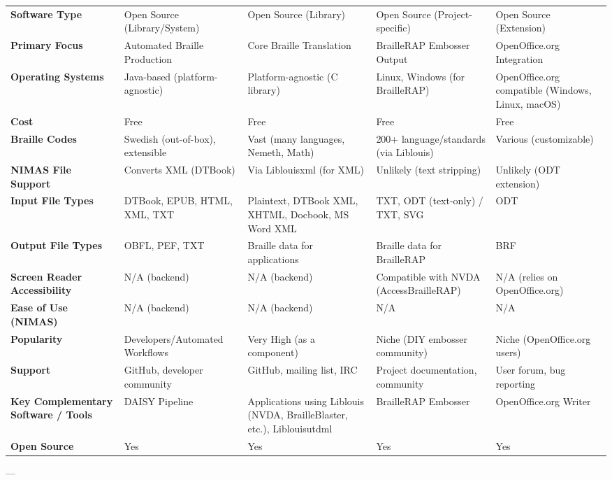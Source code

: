 \begin{longtable}{|p{2.5cm}|p{2.5cm}|p{2.5cm}|p{2.5cm}|}
\textbf{Software Type} & Open Source (Library/System) & Open Source (Library) & Open Source (Project-specific) & Open Source (Extension) \\
\textbf{Primary Focus} & Automated Braille Production & Core Braille Translation & BrailleRAP Embosser Output & OpenOffice.org Integration \\
\textbf{Operating Systems} & Java-based (platform-agnostic) & Platform-agnostic (C library) & Linux, Windows (for BrailleRAP) & OpenOffice.org compatible (Windows, Linux, macOS) \\
\textbf{Cost} & Free & Free & Free & Free \\
\textbf{Braille Codes} & Swedish (out-of-box), extensible & Vast (many languages, Nemeth, Math) & 200+ language/standards (via Liblouis) & Various (customizable) \\
\textbf{NIMAS File Support} & Converts XML (DTBook) & Via Liblouisxml (for XML) & Unlikely (text stripping) & Unlikely (ODT extension) \\
\textbf{Input File Types} & DTBook, EPUB, HTML, XML, TXT & Plaintext, DTBook XML, XHTML, Docbook, MS Word XML & TXT, ODT (text-only) / TXT, SVG & ODT \\
\textbf{Output File Types} & OBFL, PEF, TXT & Braille data for applications & Braille data for BrailleRAP & BRF \\
\textbf{Screen Reader Accessibility} & N/A (backend) & N/A (backend) & Compatible with NVDA (AccessBrailleRAP) & N/A (relies on OpenOffice.org) \\
\textbf{Ease of Use (NIMAS)} & N/A (backend) & N/A (backend) & N/A & N/A \\
\textbf{Popularity} & Developers/Automated Workflows & Very High (as a component) & Niche (DIY embosser community) & Niche (OpenOffice.org users) \\
\textbf{Support} & GitHub, developer community & GitHub, mailing list, IRC & Project documentation, community & User forum, bug reporting \\
\textbf{Key Complementary Software / Tools} & DAISY Pipeline & Applications using Liblouis (NVDA, BrailleBlaster, etc.), Liblouisutdml & BrailleRAP Embosser & OpenOffice.org Writer \\
\textbf{Open Source} & Yes & Yes & Yes & Yes \\
\hline
\end{longtable}

---


